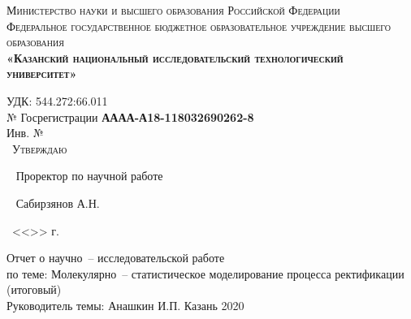 \begin{center}
	\textsc{\large{Министерство науки и высшего образования Российской Федерации}\\
	\footnotesize{Федеральное государственное бюджетное образовательное учреждение высшего образования}\\ 
	\small{\textbf{«Казанский национальный исследовательский технологический университет»}}\\}
\end{center}

	\hfill \break
	\normalsize{УДК: 544.272:66.011}\\
	\normalsize{№ Госрегистрации \textbf{АААА-А18-118032690262-8}}\\
	\normalsize{Инв. №}\\
	
	\large
	~\hspace{9cm}\textsc{Утверждаю}
	
	~\hspace{7cm} Проректор по научной работе
	
	~\hspace{7cm}\underline{\hspace{3cm}} Сабирзянов А.Н.
	
	~\hspace{7cm}<<\underline{\hspace{1cm}}>> \underline{\hspace{4cm}} г.
	
	\hfill \break
\begin{center}
	\Large{Отчет о научно~-- исследовательской работе}\\
	\hfill \break
	\Large{по теме: Молекулярно~-- статистическое моделирование процесса ректификации\\(итоговый)}\\
	\hfill \break
	\hfill \break
	\normalsize
	\large
Руководитель темы:\hspace{5cm}   \underline{\hspace{2.7cm}} Анашкин И.П.
\hfill \break
\vspace{8cm}
\hfill \break
 Казань 2020
\end{center}
\thispagestyle{empty} %


\newpage

